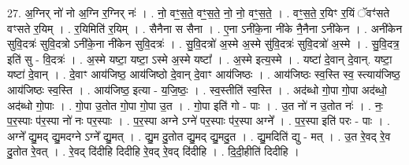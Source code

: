 \documentclass[17pt]{extarticle}
\begin{document}
27. अ॒ग्निर् नो॑ नो अ॒ग्नि र॒ग्निर् नः॑ । . नो॒ वꣳ॒॒स॒ते॒ वꣳ॒॒स॒ते॒ नो॒ नो॒ वꣳ॒॒स॒ते॒ । . वꣳ॒॒स॒ते॒ र॒यिꣳ र॒यिं ॅवꣳ॑सते वꣳसते र॒यिम् । . र॒यिमिति॑ र॒यिम् । . सैनैना स सैना । . ए॒ना ऽनी॑के॒ना नी॑के नै॒नैना ऽनी॑केन । . अनी॑केन सुवि॒दत्रः॑ सुवि॒दत्रो ऽनी॑के॒ना नी॑केन सुवि॒दत्रः॑ । . सु॒वि॒दत्रो॑ अ॒स्मे अ॒स्मे सु॑वि॒दत्रः॑ सुवि॒दत्रो॑ अ॒स्मे । . सु॒वि॒दत्र॒ इति॑ सु - वि॒दत्रः॑ । . अ॒स्मे यष्टा॒ यष्टा॒ ऽस्मे अ॒स्मे यष्टा᳚ । . अ॒स्मे इत्य॒स्मे । . यष्टा॑ दे॒वान् दे॒वान्. यष्टा॒ यष्टा॑ दे॒वान् । . दे॒वाꣳ आय॑जिष्ठ॒ आय॑जिष्ठो दे॒वान् दे॒वाꣳ आय॑जिष्ठः । . आय॑जिष्ठः स्व॒स्ति स्व॒ स्त्याय॑जिष्ठ॒ आय॑जिष्ठः स्व॒स्ति । . आय॑जिष्ठ॒ इत्या - य॒जि॒ष्ठः॒ । . स्व॒स्तीति॑ स्व॒स्ति । . अद॑ब्धो गो॒पा गो॒पा अद॑ब्धो॒ अद॑ब्धो गो॒पाः । . गो॒पा उ॒तोत गो॒पा गो॒पा उ॒त । . गो॒पा इति॑ गो - पाः । . उ॒त नो॑ न उ॒तोत नः॑ । . नः॒ प॒र॒स्पाः प॑र॒स्पा नो॑ नः पर॒स्पाः । . प॒र॒स्पा अग्ने ऽग्ने॑ पर॒स्पाः प॑र॒स्पा अग्ने᳚ । . प॒र॒स्पा इति॑ परः - पाः । . अग्ने᳚ द्यु॒मद् द्यु॒मदग्ने ऽग्ने᳚ द्यु॒मत् । . द्यु॒म दु॒तोत द्यु॒मद् द्यु॒मदु॒त । . द्यु॒मदिति॑ द्यु - मत् । . उ॒त रे॒वद् रे॒व दु॒तोत रे॒वत् । . रे॒वद् दि॑दीहि दिदीहि रे॒वद् रे॒वद् दि॑दीहि । . दि॒दी॒हीति॑ दिदीहि । \newline
\end{document}
